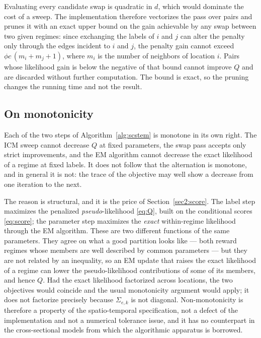 Evaluating every candidate swap is quadratic in $d$, which would dominate the cost of a sweep. The implementation therefore vectorizes the pass over pairs and prunes it with an exact upper bound on the gain achievable by any swap between two given regimes: since exchanging the labels of $i$ and $j$ can alter the penalty only through the edges incident to $i$ and $j$, the penalty gain cannot exceed $\phi c\,(m_i + m_j + 1)$, where $m_i$ is the number of neighbors of location $i$. Pairs whose likelihood gain is below the negative of that bound cannot improve $Q$ and are discarded without further computation. The bound is exact, so the pruning changes the running time and not the result.

\subsection{On monotonicity}\label{sec:monotone}

Each of the two steps of Algorithm~\ref{alg:scstem} is monotone in its own right. The ICM sweep cannot decrease $Q$ at fixed parameters, the swap pass accepts only strict improvements, and the EM algorithm cannot decrease the exact likelihood of a regime at fixed labels. It does not follow that the alternation is monotone, and in general it is not: the trace of the objective may well show a decrease from one iteration to the next.

The reason is structural, and it is the price of Section~\ref{sec2:score}. The label step maximizes the penalized \emph{pseudo}-likelihood \eqref{eq:Q}, built on the conditional scores \eqref{eq:score}; the parameter step maximizes the \emph{exact} within-regime likelihood through the EM algorithm. These are two different functions of the same parameters. They agree on what a good partition looks like --- both reward regimes whose members are well described by common parameters --- but they are not related by an inequality, so an EM update that raises the exact likelihood of a regime can lower the pseudo-likelihood contributions of some of its members, and hence $Q$. Had the exact likelihood factorized across locations, the two objectives would coincide and the usual monotonicity argument would apply; it does not factorize precisely because $\Sigma_{e,k}$ is not diagonal. Non-monotonicity is therefore a property of the spatio-temporal specification, not a defect of the implementation and not a numerical tolerance issue, and it has no counterpart in the cross-sectional models from which the algorithmic apparatus is borrowed.

